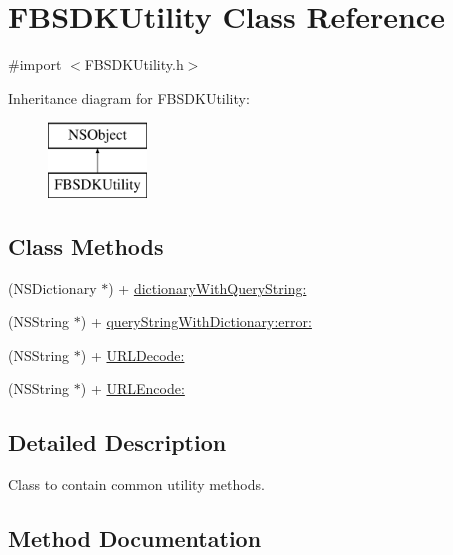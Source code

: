 \hypertarget{interface_f_b_s_d_k_utility}{}\section{F\+B\+S\+D\+K\+Utility Class Reference}
\label{interface_f_b_s_d_k_utility}


{\ttfamily \#import $<$F\+B\+S\+D\+K\+Utility.\+h$>$}

Inheritance diagram for F\+B\+S\+D\+K\+Utility\+:\begin{figure}[H]
\begin{center}
\leavevmode
\includegraphics[height=2.000000cm]{interface_f_b_s_d_k_utility}
\end{center}
\end{figure}
\subsection*{Class Methods}
\begin{DoxyCompactItemize}
\item 
(N\+S\+Dictionary $\ast$) + \hyperlink{interface_f_b_s_d_k_utility_a2db20496809c545b0488a2034b6d9ddf}{dictionary\+With\+Query\+String\+:}
\item 
(N\+S\+String $\ast$) + \hyperlink{interface_f_b_s_d_k_utility_aec88416ed4a6b25ba45cf25c85d1835d}{query\+String\+With\+Dictionary\+:error\+:}
\item 
(N\+S\+String $\ast$) + \hyperlink{interface_f_b_s_d_k_utility_ad228bd3c5c619481fdc05d87c530bcd4}{U\+R\+L\+Decode\+:}
\item 
(N\+S\+String $\ast$) + \hyperlink{interface_f_b_s_d_k_utility_a4ca5debbcfbb8dbeeab93fece42cf57a}{U\+R\+L\+Encode\+:}
\end{DoxyCompactItemize}


\subsection{Detailed Description}
Class to contain common utility methods. 

\subsection{Method Documentation}
\hypertarget{interface_f_b_s_d_k_utility_a2db20496809c545b0488a2034b6d9ddf}{}

